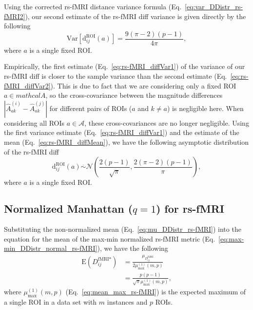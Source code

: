 \documentclass[aoas]{imsart}
\begin{document}
Using the corrected rs-fMRI distance variance formula (Eq.~\ref{eq:var_DDistr_rs-fMRI2}), our second estimate of the rs-fMRI diff variance is given directly by the following
%
\begin{equation}\label{eq:rs-fMRI_diffVar2}
\text{Var}\left[\text{d}^\text{ROI}_{ij}(a)\right] = \frac{9(\pi - 2)(p - 1)}{4\pi},
\end{equation}
%
where $a$ is a single fixed ROI.

Empirically, the first estimate (Eq.~\ref{eq:rs-fMRI_diffVar1}) of the variance of our rs-fMRI diff is closer to the sample variance than the second estimate (Eq.~\ref{eq:rs-fMRI_diffVar2}). This is due to fact that we are considering only a fixed ROI $a \in mathcal{A}$, so the cross-covariance between the magnitude differences $\left|\hat{A}^{(i)}_{ak} - \hat{A}^{(j)}_{ak}\right|$ for different pairs of ROIs ($a$ and $k \neq a$) is negligible here. When considering all ROIs $a \in \mathcal{A}$, these cross-covariances are no longer negligible. Using the first variance estimate (Eq.~\ref{eq:rs-fMRI_diffVar1}) and the estimate of the mean (Eq.~\ref{eq:rs-fMRI_diffMean}), we have the following asymptotic distribution of the rs-fMRI diff
%
\begin{equation}
\text{d}^\text{ROI}_{ij}(a) \overset{.}{\sim} \mathcal{N}\left(\frac{2(p-1)}{\sqrt{\pi}},\frac{2(\pi - 2)(p-1)}{\pi}\right),
\end{equation}
%
where $a$ is a single fixed ROI.

\subsection{Normalized Manhattan \texorpdfstring{($q=1$)}{} for rs-fMRI}

Substituting the non-normalized mean (Eq.~\ref{eq:mu_DDistr_rs-fMRI}) into the equation for the mean of the max-min normalized rs-fMRI metric (Eq.~\ref{eq:max-min_DDistr_normal_rs-fMRI}), we have the following
%
\begin{equation}\label{eq:mu_max-min_rs-fMRI}
\begin{aligned}
\text{E}\left(D^\text{fMRI*}_{ij}\right) &= \frac{\mu_{D^\text{fMRI}_{ij}}}{2\mu^{(1)}_\text{max}(m,p)} \\
&= \frac{p(p-1)}{\sqrt{\pi}\mu^{(1)}_\text{max}(m,p)},
\end{aligned}
\end{equation}
%
where $\mu^{(1)}_\text{max}(m,p)$ (Eq.~\ref{eq:mean_max_rs-fMRI}) is the expected maximum of a single ROI in a data set with $m$ instances and $p$ ROIs.
\end{document}
